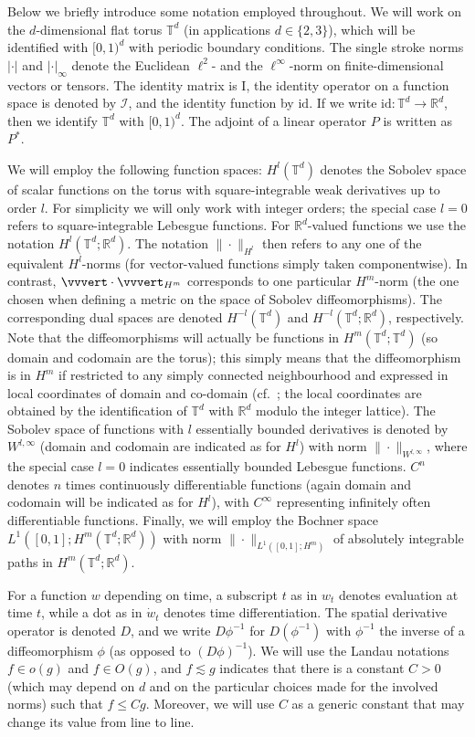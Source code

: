 \documentclass[a4paper, 12pt]{article}
\newcommand{\R}{\mathbb{R}}
\newcommand{\T}{\mathbb{T}}
\newcommand{\id}{\mathrm{id}}
\newcommand{\onesymbol}{\mathrm{I}}
\newcommand{\Id}{{\mathcal{I}}}
\newcommand{\NHm}[1]{\vvvert#1\vvvert_{H^m}} %
\begin{document}
Below we briefly introduce some notation employed throughout.
We will work on the $d$-dimensional flat torus $\T^d$ (in applications $d\in\{2,3\}$),
which will be identified with $[0,1)^d$ with periodic boundary conditions.
The single stroke norms $|\cdot|$ and $|\cdot|_\infty$ denote the Euclidean $\ell^2$- and the $\ell^\infty$-norm on finite-dimensional vectors or tensors.
The identity matrix is $\onesymbol$, the identity operator on a function space is denoted by $\Id$, and the identity function by $\id$.
If we write $\id:\T^d\to\R^d$, then we identify $\T^d$ with $[0,1)^d$.
The adjoint of a linear operator $P$ is written as $P^*$.

We will employ the following function spaces:
$H^l(\T^d)$ denotes the Sobolev space of scalar functions on the torus with square-integrable weak derivatives up to order $l$.
For simplicity we will only work with integer orders; the special case $l=0$ refers to square-integrable Lebesgue functions.
For $\R^d$-valued functions we use the notation $H^l(\T^d;\R^d)$.
The notation $\|\cdot\|_{H^l}$ then refers to any one of the equivalent $H^l$-norms (for vector-valued functions simply taken componentwise).
In contrast, $\NHm{\cdot}$ corresponds to one particular $H^m$-norm (the one chosen when defining a metric on the space of Sobolev diffeomorphisms).
The corresponding dual spaces are denoted $H^{-l}(\T^d)$ and $H^{-l}(\T^d;\R^d)$, respectively.
Note that the diffeomorphisms will actually be functions in $H^m(\T^d;\T^d)$ (so domain and codomain are the torus);
this simply means that the diffeomorphism is in $H^m$ if restricted to any simply connected neighbourhood
and expressed in local coordinates of domain and co-domain (cf.\ \cite[\S\,4.3]{Ta23}; the local coordinates are obtained by the identification of $\T^d$ with $\R^d$ modulo the integer lattice).
The Sobolev space of functions with $l$ essentially bounded derivatives is denoted by $W^{l,\infty}$ (domain and codomain are indicated as for $H^l$) with norm $\|\cdot\|_{W^{l,\infty}}$,
where the special case $l=0$ indicates essentially bounded Lebesgue functions.
$C^n$ denotes $n$ times continuously differentiable functions (again domain and codomain will be indicated as for $H^l$), with $C^\infty$ representing infinitely often differentiable functions.
Finally, we will employ the Bochner space $L^1([0,1];H^m(\T^d;\R^d))$ with norm $\|\cdot\|_{L^1([0,1];H^m)}$ of absolutely integrable paths in $H^m(\T^d;\R^d)$.

For a function $w$ depending on time, a subscript $t$ as in $w_t$ denotes evaluation at time $t$, while a dot as in $\dot w_t$ denotes time differentiation.
The spatial derivative operator is denoted $D$, and we write $D\phi^{-1}$ for $D(\phi^{-1})$ with $\phi^{-1}$ the inverse of a diffeomorphism $\phi$ (as opposed to $(D\phi)^{-1}$).
We will use the Landau notations $f\in o(g)$ and $f\in O(g)$, and $f\lesssim g$ indicates that there is a constant $C>0$
(which may depend on $d$ and on the particular choices made for the involved norms) such that $f\leq Cg$.
Moreover, we will use $C$ as a generic constant that may change its value from line to line.
\end{document}
